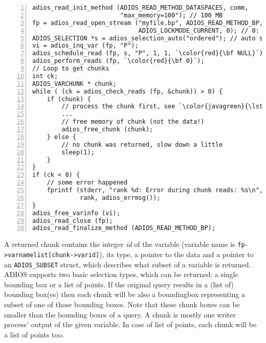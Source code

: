 \begin{lstlisting}[numbers=left, numberstyle=\color{gray}, stepnumber=2,
                             caption={Read variable with auto selection in chunks from a stream}, label=code:auto_read_chunks]
adios_read_init_method (ADIOS_READ_METHOD_DATASPACES, comm, 
                        "max_memory=100"); // 100 MB 
fp = adios_read_open_stream ("myfile.bp", ADIOS_READ_METHOD_BP, comm,
                             ADIOS_LOCKMODE_CURRENT, 0); // 0: wait forever
ADIOS_SELECTION *s = adios_selection_auto("ordered"); // auto selection with a hint
vi = adios_inq_var (fp, "P");
adios_schedule_read (fp, s, "P", 1, 1, `\color{red}{\bf NULL}`);
adios_perform_reads (fp, `\color{red}{\bf 0}`);   
// Loop to get chunks
int ck;
ADIOS_VARCHUNK * chunk;
while ( (ck = adios_check_reads (fp, &chunk)) > 0) {
    if (chunk) {
        // process the chunk first, see `\color{javagreen}{\lstlistingname~\ref{code:process_chunk}}`
        ... 
        // free memory of chunk (not the data!)
        adios_free_chunk (chunk);
    } else {
        // no chunk was returned, slow down a little
        sleep(1);
    }
}  
if (ck < 0) {
    // some error happened
    fprintf (stderr, "rank %d: Error during chunk reads: %s\n",
             rank, adios_errmsg());
}
adios_free_varinfo (vi); 
adios_read_close (fp);
adios_read_finalize_method (ADIOS_READ_METHOD_BP);
\end{lstlisting}

A returned chunk contains the integer \emph{id} of the variable (variable name is \verb+fp->varnamelist[chunk->varid]+), its type, a pointer to the data and a pointer to an \verb+ADIOS_SUBSET+ struct, which describes what subset of a variable is returned. ADIOS supports two basic selection types, which can be returned: a single bounding box or a list of points. If the original query results in a (list of) bounding box(es) then each chunk will be also a boundingbox representing a subset of one of those bounding boxes. Note that these chunk boxes can be smaller than the bounding boxes of a query. A chunk is mostly one writer process' output of the given variable. In case of list of points, each chunk will be a list of points too. 

